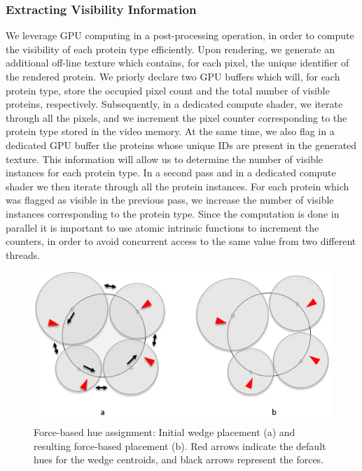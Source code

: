 \documentclass{egpubl}
\begin{document}
	\subsubsection{Extracting Visibility Information}
	\label{sssec:extracting}
	We leverage GPU computing in a post-processing operation, in order to compute the visibility of each protein type efficiently.
	Upon rendering, we generate an additional off-line texture which contains, for each pixel, the unique identifier of the rendered protein.
	We priorly declare two GPU buffers which will, for each protein type, store the occupied pixel count and the total number of visible proteins, respectively.
	Subsequently, in a dedicated compute shader, we iterate through all the pixels, and we increment the pixel counter corresponding to the protein type stored in the video memory.
	At the same time, we also flag in a dedicated GPU buffer the proteins whose unique IDs are present in the generated texture.
	This information will allow us to determine the number of visible instances for each protein type.
	In a second pass and in a dedicated compute shader we then iterate through all the protein instances.
	For each protein which was flagged as visible in the previous pass, we increase the number of visible instances corresponding to the protein type.
	Since the computation is done in parallel it is important to use atomic intrinsic functions to increment the counters, in order to avoid concurrent access to the same value from two different threads.
	
	\begin{figure}
		\centering
		\includegraphics[width=0.85\linewidth]{"Figures/force-based layout"}
		\caption{Force-based hue assignment: Initial wedge placement (a) and resulting force-based placement (b). Red arrows indicate the default hues for the wedge centroids, and black arrows represent the forces. }
		\label{fig:force-basedlayout}
	\end{figure}
	
\end{document}
